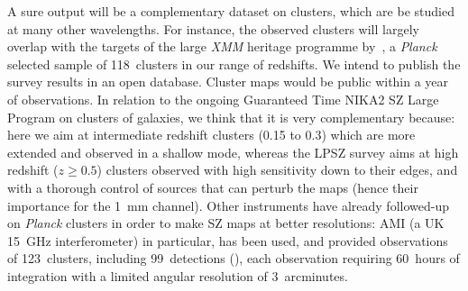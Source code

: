 \documentclass[10pt,a4paper,twoside,graphicx,color]{article}
\begin{document}
A sure output will be a complementary dataset on clusters, which are
be studied at many other wavelengths.  For instance, the observed
clusters will largely overlap with the targets of the large {\sl XMM}
heritage programme by~\cite{ChexMate2020}, a {\sl Planck} selected sample
of 118~clusters in our range of redshifts. We intend to publish the
survey results in an open database. Cluster maps would be public
within a year of observations. In relation to the ongoing Guaranteed
Time NIKA2 SZ Large Program on clusters of galaxies, we think that it
is very complementary because: here we aim at intermediate redshift
clusters (0.15 to 0.3) which are more extended and observed in a
shallow mode, whereas the LPSZ survey aims at high redshift ($z\ge
0.5$) clusters observed with high sensitivity down to their edges, and
with a thorough control of sources that can perturb the maps (hence
their importance for the 1~mm channel). Other instruments have already
followed-up on {\sl Planck} clusters in order to make SZ maps at
better resolutions: AMI (a UK 15~GHz interferometer) in particular,
has been used, and provided observations of 123~clusters, including
99~detections (\cite{Perrott2015}), each observation requiring
60~hours of integration with a limited angular resolution of
3~arcminutes.\\
\end{document}
